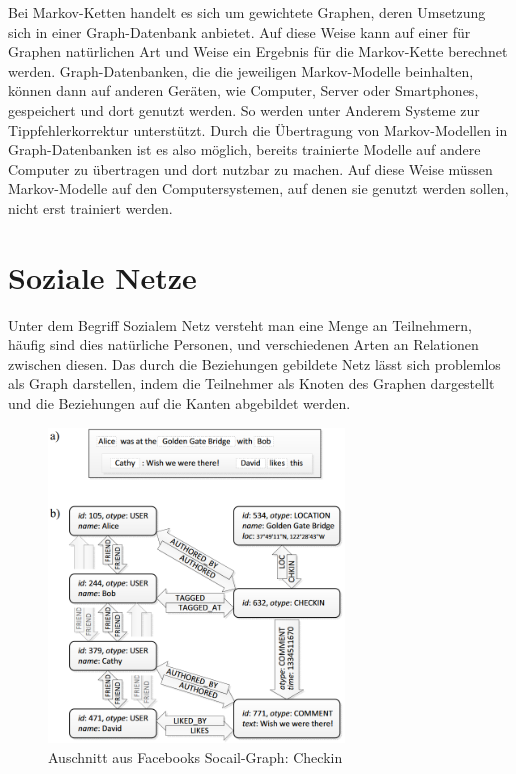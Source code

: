 Bei Markov-Ketten handelt es sich um gewichtete Graphen, deren Umsetzung sich in einer Graph-Datenbank anbietet. Auf diese Weise kann auf einer für Graphen natürlichen Art und Weise ein Ergebnis für die Markov-Kette berechnet werden. Graph-Datenbanken, die die jeweiligen Markov-Modelle beinhalten, können dann auf anderen Geräten, wie Computer, Server oder Smartphones, gespeichert und dort genutzt werden. So werden unter Anderem Systeme zur Tippfehlerkorrektur unterstützt. Durch die Übertragung von Markov-Modellen in Graph-Datenbanken ist es also möglich, bereits trainierte Modelle auf andere Computer zu übertragen und dort nutzbar zu machen. Auf diese Weise müssen Markov-Modelle auf den Computersystemen, auf denen sie genutzt werden sollen, nicht erst trainiert werden.

\section{Soziale Netze}
Unter dem Begriff Sozialem Netz versteht man eine Menge an Teilnehmern, häufig sind dies natürliche Personen, und verschiedenen Arten an Relationen zwischen diesen. Das durch die Beziehungen gebildete Netz lässt sich problemlos als Graph darstellen, indem die Teilnehmer als Knoten des Graphen dargestellt und die Beziehungen auf die Kanten abgebildet werden.

\begin{figure}[h]
	\caption{Auschnitt aus Facebooks Socail-Graph: Checkin \cite{facebookTao}}
	\label{fig:fbCheckin}
	\centering
	\includegraphics[width=0.7\textwidth]{images/facebook_checkin.png}
\end{figure}

